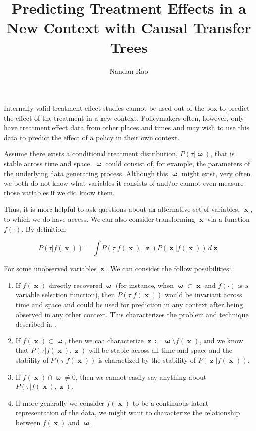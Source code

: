 \documentclass[a4paper,12pt]{article}
\title{ Predicting Treatment Effects in a New Context with Causal Transfer Trees }
\author{Nandan Rao}
\DeclareMathOperator*{\om}{\mathbf{\omega}}
\DeclareMathOperator*{\x}{\mathbf{x}}
\DeclareMathOperator*{\z}{\mathbf{z}}
\begin{document}
Internally valid treatment effect studies cannot be used out-of-the-box to predict the effect of the treatment in a new context. Policymakers often, however, only have treatment effect data from other places and times and may wish to use this data to predict the effect of a policy in their own context.

Assume there exists a conditional treatment distribution, $ P(\tau | \om) $, that is stable across time and space. $\om$ could consist of, for example, the parameters of the underlying data generating process. Although this $\om$ might exist, very often we both do not know what variables it consists of and/or cannot even measure those variables if we did know them.

Thus, it is more helpful to ask questions about an alternative set of variables, $\x$, to which we do have access. We can also consider transforming $\x$ via a function $f(\cdot)$. By definition:

$$
P(\tau | f(\x) ) = \int P(\tau | f(\x), \z ) P( \z | f(\x)) \ d\z
$$

For some unobserved variables $\z$. We can consider the follow possibilities:

\begin{enumerate}
\item If $f(\x)$ directly recovered $\om$ (for instance, when $\om \subset \x$ and $f(\cdot)$ is a variable selection function), then $P(\tau | f(\x))$ would be invariant across time and space and could be used for prediction in any context after being observed in any other context. This characterizes the problem and technique described in \cite{Rojas-carulla2018}.

\item If $f(\x) \subset \om$, then we can characterize $\z \coloneqq \om \setminus f(\x)$, and we know that $P(\tau | f(\x), \z )$ will be stable across all time and space and the stability of $P(\tau | f(\x) )$ is charactized by the stability of $P( \z | f(\x))$.

\item If $f(\x) \cap \om \neq 0$, then we cannot easily say anything about $P(\tau | f(\x), \z )$. 


\item If more generally we consider $f(\x)$ to be a continuous latent representation of the data, we might want to characterize the relationship between $f(\x)$ and $\om$. 

\end{enumerate}
\end{document}
